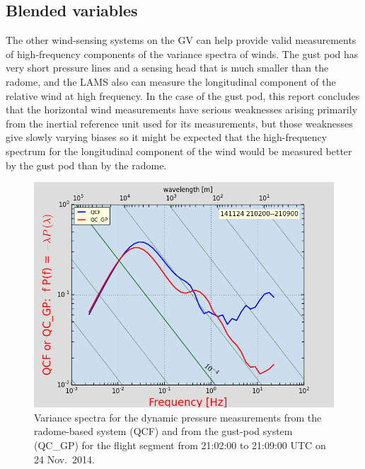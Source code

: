 \documentclass[12pt,twoside,english]{article}\usepackage[]{graphicx}\usepackage[]{color}
\let\OrgIndex\index
\renewcommand*{\index}[1]{\OrgIndex{#1}}
\begin{document}
\subsection{\textquotedbl{}Blended\textquotedbl{} variables}

The other wind-sensing systems on the GV can help provide valid measurements of high-frequency components of the variance spectra of winds. The gust pod has very short pressure lines and a sensing head that is much smaller than the radome, and the LAMS also can measure the longitudinal component of the relative wind at high frequency. In the case of the gust pod, this report concludes that the horizontal wind measurements have serious weaknesses arising primarily from the inertial reference unit used for its measurements, but those weaknesses give slowly varying biases so it might be expected that the high-frequency spectrum for the longitudinal component of the wind would be measured better by the gust pod than by the radome. 


\begin{figure}
\noindent \begin{centering}
\includegraphics[height=0.4\textheight]{SpecialGraphics/MEMPlotQC.png}  
\par\end{centering}

\protect\protect\protect\caption{\label{fig:AppxB-PSD1314}Variance spectra for the dynamic pressure measurements from the radome-based system (QCF) and from the gust-pod system (QC\_GP) for the flight segment from 21:02:00 to 21:09:00 UTC on 24 Nov.\ 2014.} 
\end{figure}
\end{document}
